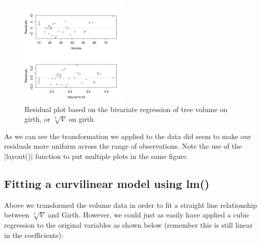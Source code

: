 %
%
\begin{figure}[htbp]
\centering
\includegraphics[height=2in]{./figures/hands-on4/compare-residuals.pdf}
\caption{Residual plot based on the bivariate regression of tree volume on girth, or $\sqrt[3]{V}$ on girth \label{fig:compare-resid}}
\end{figure}
%
As we can see the transformation we applied to the data did seem to make our residuals more uniform across the range of observations. Note the use of the |layout()| function to put multiple plots in the same figure.

\subsection{Fitting a curvilinear model using lm()}

Above we transformed the volume data in order to fit a straight line relationship between $$  and Girth. However, we could just as easily have applied a cubic regression to the original variables as shown below (remember this is still linear  in the coefficients):

